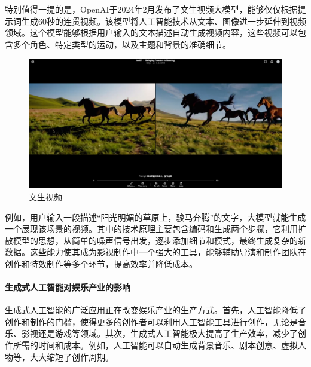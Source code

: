特别值得一提的是，OpenAI于2024年2月发布了文生视频大模型，能够仅仅根据提示词生成60秒的连贯视频。该模型将人工智能技术从文本、图像进一步延伸到视频领域。这个模型能够根据用户输入的文本描述自动生成视频内容，这些视频可以包含多个角色、特定类型的运动，以及主题和背景的准确细节。

\begin{figure}[ht]
  \centering
  \includegraphics[width=\linewidth]{image/4/sora.png}
  \caption{文生视频}
  \label{fig:sora}
\end{figure}

例如，用户输入一段描述“阳光明媚的草原上，骏马奔腾”的文字，大模型就能生成一个展现该场景的视频。其中的技术原理主要包含编码和生成两个步骤，它利用扩散模型的思想，从简单的噪声信号出发，逐步添加细节和模式，最终生成复杂的新数据。这些能力使其成为影视制作中一个强大的工具，能够辅助导演和制作团队在创作和特效制作等多个环节，提高效率并降低成本。

\paragraph{生成式人工智能对娱乐产业的影响}



生成式人工智能的广泛应用正在改变娱乐产业的生产方式。首先，人工智能降低了创作和制作的门槛，使得更多的创作者可以利用人工智能工具进行创作，无论是音乐、影视还是游戏等领域。其次，生成式人工智能极大提高了生产效率，减少了创作所需的时间和成本。例如，人工智能可以自动生成背景音乐、剧本创意、虚拟人物等，大大缩短了创作周期。

